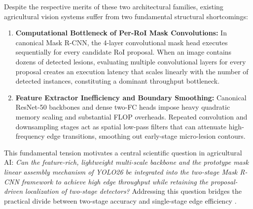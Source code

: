 \documentclass[5p,times]{elsarticle}
\begin{document}
Despite the respective merits of these two architectural families, existing agricultural vision systems suffer from two fundamental structural shortcomings:
\begin{enumerate}
    \item \textbf{Computational Bottleneck of Per-RoI Mask Convolutions:} In canonical Mask R-CNN, the 4-layer convolutional mask head executes sequentially for every candidate RoI proposal. When an image contains dozens of detected lesions, evaluating multiple convolutional layers for every proposal creates an execution latency that scales linearly with the number of detected instances, constituting a dominant throughput bottleneck.
    \item \textbf{Feature Extractor Inefficiency and Boundary Smoothing:} Canonical ResNet-50 backbones and dense two-FC heads impose heavy quadratic memory scaling and substantial FLOP overheads. Repeated convolution and downsampling stages act as spatial low-pass filters that can attenuate high-frequency edge transitions, smoothing out early-stage micro-lesion contours.
\end{enumerate}

This fundamental tension motivates a central scientific question in agricultural AI: \textit{Can the feature-rich, lightweight multi-scale backbone and the prototype mask linear assembly mechanism of YOLO26 be integrated into the two-stage Mask R-CNN framework to achieve high edge throughput while retaining the proposal-driven localization of two-stage detectors?} Addressing this question bridges the practical divide between two-stage accuracy and single-stage edge efficiency \cite{miao2025serpensgate, hong2026improved, chug2025segformerdiffusion}.
\end{document}
